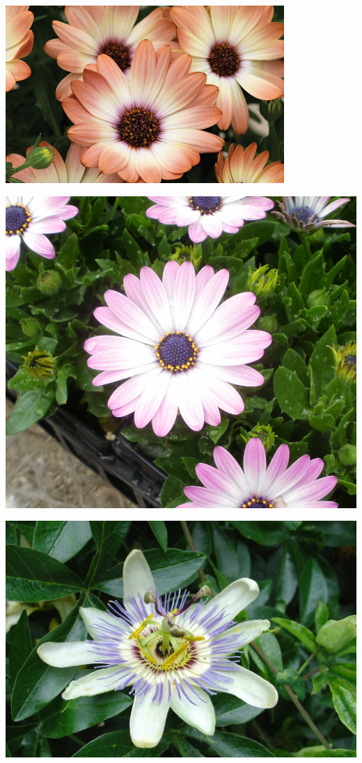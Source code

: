 \documentclass{article}
\begin{document}
\begin{center}
\includegraphics[height=0.925\paperheight]{../Osteospermum3.jpg}
\end{center}
\newpage

\begin{center}
\includegraphics[height=0.925\paperheight]{../Ostespermum2.jpg}
\end{center}
\newpage

\begin{center}
\includegraphics[height=0.925\paperheight]{../Passiflora_(PassionFlower).jpg}
\end{center}
\newpage
\end{document}
